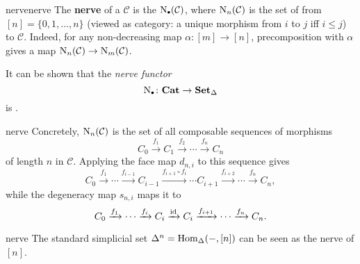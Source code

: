 \begin{topic}{nerve}{nerve}
    The \textbf{nerve} of a  $\mathcal{C}$ is the  $\textup{N}_\bdot(\mathcal{C})$, where $\textup{N}_n(\mathcal{C})$ is the set of  from $[n] = \{ 0, 1, \ldots, n \}$ (viewed as category: a unique morphism from $i$ to $j$ iff $i \le j$) to $\mathcal{C}$.
    Indeed, for any non-decreasing map $\alpha \colon [m] \to [n]$, precomposition with $\alpha$ gives a map $\textup{N}_n(\mathcal{C}) \to \textup{N}_m(\mathcal{C})$.
    
    It can be shown that the \textit{nerve functor}
    \[ \textup{N}_\bdot \colon \textbf{Cat} \to \textbf{Set}_\Delta \]
    is  .
\end{topic}

\begin{example}{nerve}
    Concretely, $\textup{N}_n(\mathcal{C})$ is the set of all composable sequences of morphisms
    \[ C_0 \xrightarrow{f_1} C_1 \xrightarrow{f_2} \cdots \xrightarrow{f_n} C_n \]
    of length $n$ in $\mathcal{C}$. Applying the face map $d_{n, i}$ to this sequence gives
    \[ C_0 \xrightarrow{f_1} \cdots \xrightarrow{f_{i - 1}} C_{i - 1} \xrightarrow{f_{i + 1} \circ f_i} \cdots C_{i + 1} \xrightarrow{f_{i + 2}} \cdots \xrightarrow{f_n} C_n , \]
    while the degeneracy map $s_{n, i}$ maps it to
    \[ C_0 \xrightarrow{f_1} \cdots \xrightarrow{f_i} C_i \xrightarrow{\textup{id}} C_i \xrightarrow{f_{i + 1}} \cdots \xrightarrow{f_n} C_n . \]
\end{example}

\begin{example}{nerve}
    The standard simplicial set $\Delta^n = \operatorname{Hom}_\Delta(-, [n])$ can be seen as the nerve of $[n]$.
\end{example}


